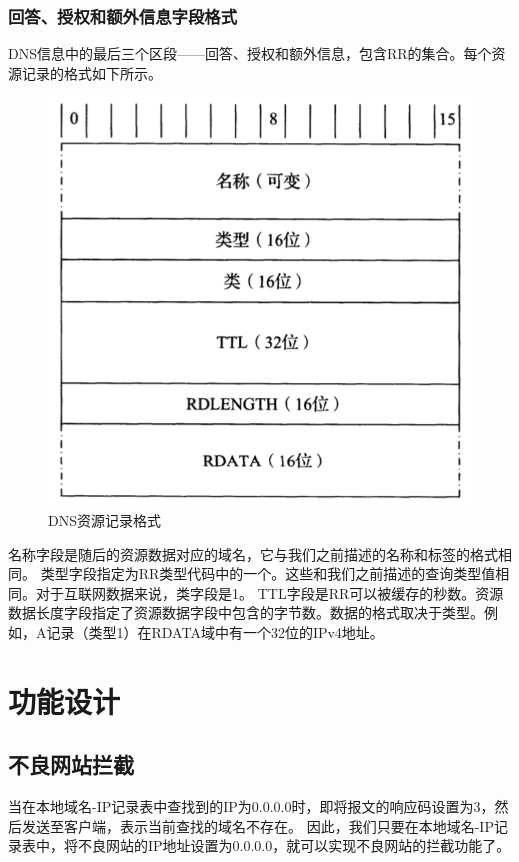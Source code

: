 \documentclass[]{article}
\begin{document}
        \subsubsection{回答、授权和额外信息字段格式}
            DNS信息中的最后三个区段——回答、授权和额外信息，包含RR的集合。每个资源记录的格式如下所示。
            \begin{figure}[ht]
                \centering
                \includegraphics[scale=0.6]{rr.png}
                \caption{DNS资源记录格式}
            \end{figure}
            名称字段是随后的资源数据对应的域名，它与我们之前描述的名称和标签的格式相同。
            类型字段指定为RR类型代码中的一个。这些和我们之前描述的查询类型值相同。对于互联网数据来说，类字段是1。 
            TTL字段是RR可以被缓存的秒数。资源数据长度字段指定了资源数据字段中包含的字节数。数据的格式取决于类型。例如，A记录（类型1）在RDATA域中有一个32位的IPv4地址。

\section{功能设计}
    \subsection{不良网站拦截}
        当在本地域名-IP记录表中查找到的IP为0.0.0.0时，即将报文的响应码设置为3，然后发送至客户端，表示当前查找的域名不存在。
        因此，我们只要在本地域名-IP记录表中，将不良网站的IP地址设置为0.0.0.0，就可以实现不良网站的拦截功能了。
\end{document}
